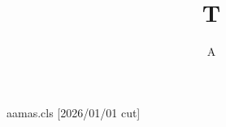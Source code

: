 \begin{filecontents*}[overwrite]{aamas.cls}
[2026/01/01 cut]
\def\doi#1{\def\@doi{10.65109/#1}}
\doi{}
\end{filecontents*}
\documentclass[sigconf]{aamas}

\title{T}\author{A}
\maketitle
Body.


